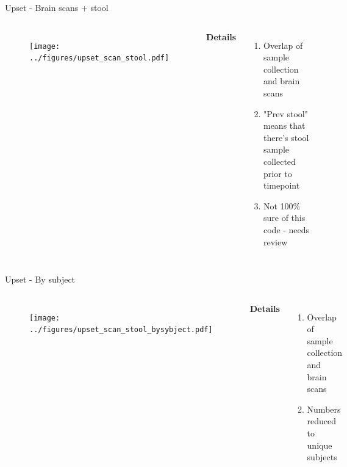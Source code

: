 \begin{frame}{Upset - Brain scans + stool}
    \begin{columns}[c] %

    
        \begin{figure}
        \texttt{[image: ../figures/upset\_scan\_stool.pdf]}
        \end{figure}

    
        \textbf{Details}
        \begin{enumerate}
            \item Overlap of sample collection and brain scans
            \item "Prev stool" means that there's stool sample collected prior to timepoint
            \item Not 100\% sure of this code - needs review
        \end{enumerate}

    \end{columns}

\end{frame}


\begin{frame}{Upset - By subject}
    \begin{columns}[c] %

    
        \begin{figure}
        \texttt{[image: ../figures/upset\_scan\_stool\_bysybject.pdf]}
        \end{figure}

    
        \textbf{Details}
        \begin{enumerate}
            \item Overlap of sample collection and brain scans
            \item Numbers reduced to unique subjects
        \end{enumerate}

    \end{columns}

\end{frame}


